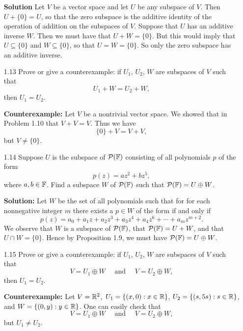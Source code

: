 \begin{enumerate}
      \textbf{Solution} Let $V$ be a vector space and let $U$ be any subspace of
      $V$. Then $U + \{0\} = U$, so that the zero subspace is the additive
      identity of the operation of addition on the subspaces of $V$. Suppose
      that $U$ has an additive inverse $W$. Then we must have that
      $U + W = \{0\}$. But this would imply that $U \subseteq \{0\}$ and
      $W \subseteq \{0\}$, so that $U = W = \{0\}$. So only the zero subspace
      has an additive inverse.
   \item[1.13] Prove or give a counterexample: if $U_1$, $U_2$, $W$ are 
               subspaces of $V$ such that
               $$U_1 + W = U_2 + W,$$
               then $U_1 = U_2$.

      \textbf{Counterexample:} Let $V$ be a nontrivial vector space. We showed
      that in Problem 1.10 that $V + V = V$. Thus we have
      $$\{0\} + V = V + V,$$
      but $V \neq \{0\}$.
   \item[1.14] Suppose $U$ is the subspace of $\mathcal{P}(\mathbb{F})$ consisting of
               all polynomials $p$ of the form
               $$p(z) = az^2 + bz^5,$$
               where $a, b \in \mathbb{F}$. Find a subspace $W$ of $\mathcal{P}(\mathbb{F})$
               such that $\mathcal{P}(\mathbb{F}) = U \oplus W$.

      \textbf{Solution:} Let $W$ be the set of all polynomials such that for
      for each nonnegative integer $m$ there exists a $p \in W$ of the form if
      and only if
      $$p(z) = a_0 + a_1z + a_2z^3 + a_3z^4 + a_4z^6 + \cdots + a_mz^{m + 2}.$$
      We observe that $W$ is a subspace of $\mathcal{P}(\mathbb{F})$, that
      $\mathcal{P}(\mathbb{F}) = U + W$, and that $U \cap W = \{0\}$. Hence by
      Proposition 1.9, we must have $\mathcal{P}(\mathbb{F}) = U \oplus W$.
   \item[1.15] Prove or give a counterexample: if $U_1$, $U_2$, $W$ are
               subspaces of $V$ such that
               $$V = U_1 \oplus W \quad \text{ and } \quad V = U_2 \oplus W,$$
               then $U_1 = U_2$.

      \textbf{Counterexample:} Let $V = \mathbb{R}^2$, $U_1 = \{(x, 0) : x \in \mathbb{R}\}$,
      $U_2 = \{(s, 5s) : s \in \mathbb{R}\}$, and $W = \{(0, y) : y \in \mathbb{R}\}$. One can
      easily check that
      $$V = U_1 \oplus W \quad \text{ and } \quad V = U_2 \oplus W,$$
      but $U_1 \neq U_2$.
\end{enumerate}
